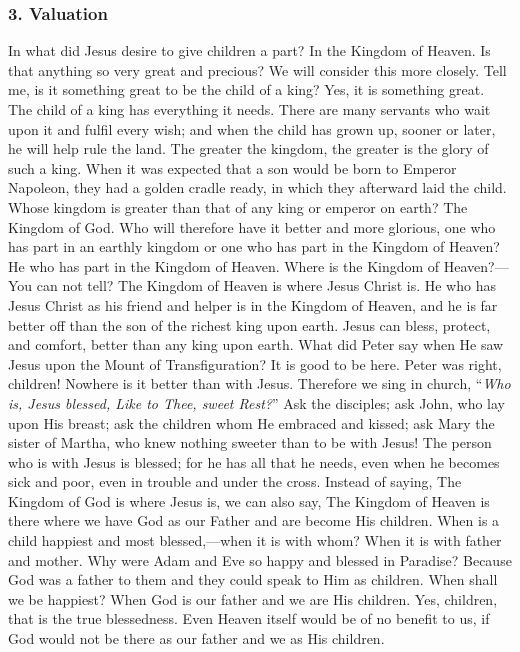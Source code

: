 \subsubsection{3. Valuation} In what did Jesus desire to give children a part? In the Kingdom of Heaven. Is that anything so very great and precious? We will consider this more closely. Tell me, is it something great to be the child of a king? Yes, it is something great. The child of a king has everything it needs. There are many servants who wait upon it and fulfil every wish; and when the child has grown up, sooner or later, he will help rule the land. The greater the kingdom, the greater is the glory of such a king. When it was expected that a son would be born to Emperor Napoleon, they had a golden cradle ready, in which they afterward laid the child. Whose kingdom is greater than that of any king or emperor on earth? The Kingdom of God. Who will therefore have it better and more glorious, one who has part in an earthly kingdom or one who has part in the Kingdom of Heaven? He who has part in the Kingdom of Heaven. Where is the Kingdom of Heaven?—You can not tell? The Kingdom of Heaven is where Jesus Christ is. He who has Jesus Christ as his friend and helper is in the Kingdom of Heaven, and he is far better off than the son of the richest king upon earth. Jesus can bless, protect, and comfort, better than any king upon earth. What did Peter say when He saw Jesus upon the Mount of Transfiguration? It is good to be here. Peter was right, children! Nowhere is it better than with Jesus. Therefore we sing in church, “\emph{Who is, Jesus blessed, Like to Thee, sweet Rest?}” Ask the disciples; ask John, who lay upon His breast; ask the children whom He embraced and kissed; ask Mary the sister of Martha, who knew nothing sweeter than to be with Jesus! The person who is with Jesus is blessed; for he has all that he needs, even when he becomes sick and poor, even in trouble and under the
cross. Instead of saying, The Kingdom of God is where Jesus is, we can also say, The Kingdom of Heaven is there where we have God as our Father and are become His children. When is a child happiest and most blessed,—when it is with whom? When it is with father and mother. Why were Adam and Eve so happy and blessed in Paradise? Because God was a father to them and they could speak to Him as children. When shall we be happiest? When God is our father and we are His children. Yes, children, that is the true blessedness. Even Heaven itself would be of no benefit to us, if God would not be there as our father and we as His children.

